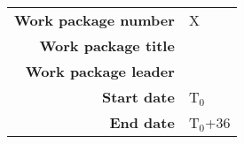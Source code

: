 % 
% 

\clearpage
\begin{center}
    \begin{tabular}{|r|p{}|}
        \hline
        \textbf{Work package number} & X\\
        \textbf{Work package title } &  \\
        \textbf{Work package leader} & \\
        \textbf{Start date}          & T$_0$\\
        \textbf{End date}            & T$_0$+36\\
        \hline
    \end{tabular}
    
\end{center}

